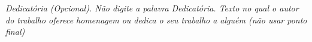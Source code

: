 \begin{dedicatoria}
	\vspace*{\fill}
	\centering
	\noindent
	\textit{Dedicatória (Opcional). Não digite a palavra Dedicatória. Texto no qual o autor do trabalho oferece homenagem ou dedica o seu trabalho a alguém (não usar ponto final)}
    \vspace*{\fill}
\end{dedicatoria}
